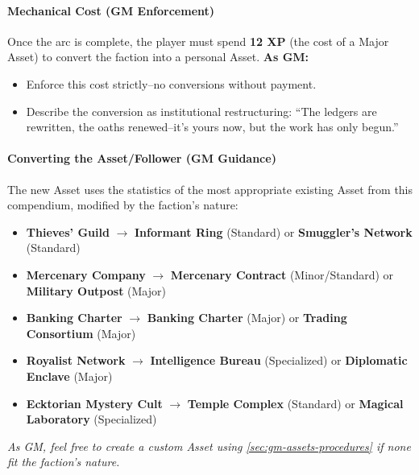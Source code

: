 \begin{tcolorbox}[colback=black!3!white,colframe=black!60!white,title=From Faction to Asset/Follower: Taking Over a Terrestrial Patron (GM Guidance),label=sec:takeover-sidebar,breakable]
\begin{enumerate}
\paragraph{Mechanical Cost (GM Enforcement)}
Once the arc is complete, the player must spend \textbf{12 XP} (the cost of a Major Asset) to convert the faction into a personal Asset. \textbf{As GM:}  
\begin{itemize}
  \item Enforce this cost strictly--no conversions without payment.  
  \item Describe the conversion as institutional restructuring: ``The ledgers are rewritten, the oaths renewed--it's yours now, but the work has only begun.''  
\end{itemize}

\paragraph{Converting the Asset/Follower (GM Guidance)}
The new Asset uses the statistics of the most appropriate existing Asset from this compendium, modified by the faction's nature:  
\begin{itemize}
  \item \textbf{Thieves' Guild} $\rightarrow$ \textbf{Informant Ring} (Standard) or \textbf{Smuggler's Network} (Standard)  
  \item \textbf{Mercenary Company} $\rightarrow$ \textbf{Mercenary Contract} (Minor/Standard) or \textbf{Military Outpost} (Major)  
  \item \textbf{Banking Charter} $\rightarrow$ \textbf{Banking Charter} (Major) or \textbf{Trading Consortium} (Major)  
  \item \textbf{Royalist Network} $\rightarrow$ \textbf{Intelligence Bureau} (Specialized) or \textbf{Diplomatic Enclave} (Major)  
  \item \textbf{Ecktorian Mystery Cult} $\rightarrow$ \textbf{Temple Complex} (Standard) or \textbf{Magical Laboratory} (Specialized)  
\end{itemize}
\textit{As GM, feel free to create a custom Asset using \ref{sec:gm-assets-procedures} if none fit the faction's nature.}


\end{enumerate}
\end{tcolorbox}
